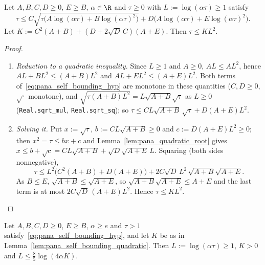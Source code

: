 \begin{lemma}\label{lem:pana_self_bounding_quadratic}
\leanok
Let $A, B, C, D \ge 0$, $E \ge B$, $\alpha \in \R$ and $\tau \ge 0$ with $L := \log(\alpha\tau) \ge 1$
satisfy
\begin{equation}\label{eq:pana_self_bounding_hyp}
  \tau \le C\sqrt{\tau\big(A\log(\alpha\tau) + B\log(\alpha\tau)^2\big)}
  + D\big(A\log(\alpha\tau) + E\log(\alpha\tau)^2\big) .
\end{equation}
Let $K := C^2(A + B) + (D + 2\sqrt D\,C)(A + E)$. Then $\tau \le K L^2$.
\end{lemma}

\begin{proof}
\leanok
\begin{enumerate}
  \item[(i)] \emph{Reduction to a quadratic inequality.} Since $L \ge 1$ and $A \ge 0$,
        $AL \le AL^2$, hence $AL + BL^2 \le (A + B)L^2$ and $AL + EL^2 \le (A + E)L^2$. Both
        terms of~\eqref{eq:pana_self_bounding_hyp} are monotone in these quantities ($C, D \ge 0$,
        $\sqrt{\cdot}$ monotone), and $\sqrt{\tau(A + B)L^2} = L\sqrt{A+B}\sqrt\tau$ as $L \ge 0$
        (\texttt{Real.sqrt\_mul}, \texttt{Real.sqrt\_sq}); so
        $\tau \le CL\sqrt{A + B}\,\sqrt\tau + D(A + E)L^2$.
  \item[(ii)] \emph{Solving it.} Put $x := \sqrt\tau$, $b := CL\sqrt{A+B} \ge 0$ and
        $c := D(A+E)L^2 \ge 0$; then $x^2 = \tau \le bx + c$ and Lemma~\ref{lem:pana_quadratic_root}
        gives $x \le b + \sqrt c = CL\sqrt{A+B} + \sqrt D\sqrt{A+E}\,L$. Squaring (both sides
        nonnegative),
        \[
          \tau \le L^2\Big(C^2(A+B) + D(A+E)\Big) + 2C\sqrt D\,L^2\,\sqrt{A+B}\sqrt{A+E} .
        \]
        As $B \le E$, $\sqrt{A+B} \le \sqrt{A+E}$, so $\sqrt{A+B}\sqrt{A+E} \le A + E$ and
        the last term is at most $2C\sqrt D\,(A+E)L^2$. Hence $\tau \le KL^2$.
\end{enumerate}
\end{proof}

\begin{lemma}\label{lem:pana_self_bounding_log}
\leanok
Let $A, B, C, D \ge 0$, $E \ge B$, $\alpha \ge e$ and $\tau > 1$
satisfy~\eqref{eq:pana_self_bounding_hyp}, and let $K$ be as in
Lemma~\ref{lem:pana_self_bounding_quadratic}. Then $L := \log(\alpha\tau) \ge 1$, $K > 0$ and
$L \le \frac85\log(4\alpha K)$.
\end{lemma}

